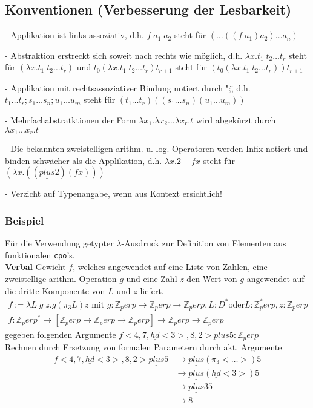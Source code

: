 \subsection{Konventionen (Verbesserung der Lesbarkeit)}
\begin{compactitem}
\item[-] Applikation ist links assoziativ, d.h. $f \; a_1 \; a_2$ steht für $(\dots((f\;a_1)a_2)\dots a_n)$
\item[-] Abstraktion erstreckt sich soweit nach rechts wie möglich, d.h. $\lambda x.t_1 \; t_2 \dots t_r$ steht für $(\lambda x.t_1 \; t_2 \dots t_r)$ und $t_0 (\lambda x.t_1 \; t_2 \dots t_r) t_{r+1}$ steht für $(t_0 (\lambda x. t_1 \; t_2 \dots t_r) ) t_{r+1}$
\item[-] Applikation mit rechtsassoziativer Bindung notiert durch ";\", d.h. $t_1 \dots t_r; s_1 \dots s_n; u_1 \dots u_m$ steht für $(t_1 \dots t_r) ((s_1 \dots s_n)( u_1 \dots u_m))$
\item[-] Mehrfachabstratktionen der Form $\lambda x_1.\lambda x_2 \dots \lambda x_r.t$ wird abgekürzt durch $\lambda x_1 \dots x_r . t$
\item[-] Die bekannten zweistelligen arithm. u. log. Operatoren werden Infix notiert und binden schwächer als die Applikation, d.h. $\lambda x. 2 + f x$ steht für $(\lambda x.((\underline{plus} 2)(f x)))$
\item[-] Verzicht auf Typenangabe, wenn aus Kontext ersichtlich!
\end{compactitem}

\subsubsection*{Beispiel} 
Für die Verwendung getypter $\lambda$-Ausdruck zur Definition von Elementen aus funktionalen \lstinline!cpo!'s.\\
\textbf{Verbal} Gewicht $f$, welches angewendet auf eine Liste von Zahlen, eine zweistellige arithm. Operation $g$ und eine Zahl $z$ den Wert von $g$ angewendet auf die dritte Komponente von $L$ und $z$ liefert.
\begin{align*}
f:=\lambda L\; g \;z . g (\pi_3 L) z \text{ mit } g : \mathbb{Z}_perp \rightarrow \mathbb{Z}_perp \rightarrow \mathbb{Z}_perp, L : D^* \text{oder} L : \mathbb{Z}^*_perp, z : \mathbb{Z}_perp\\
f : \mathbb{Z}_perp^* \rightarrow [\mathbb{Z}_perp \rightarrow \mathbb{Z}_perp \rightarrow \mathbb{Z}_perp] \rightarrow \mathbb{Z}_perp \rightarrow \mathbb{Z}_perp
\end{align*}
gegeben folgenden Argumente $f <4, 7, \underline{hd}<3>, 8, 2> \underline{plus} 5 : \mathbb{Z}_perp $ \\
Rechnen durch Ersetzung von formalen Parametern durch akt. Argumente
\begin{align*}
f <4, 7, \underline{hd}<3>, 8, 2> \underline{plus} 5 &\rightarrow \underline{plus} (\pi_3 <\dots>) 5 \\
&\rightarrow \underline{plus} (\underline{hd}<3>) 5 \\
&\rightarrow \underline{plus} 3 5 \\
& \rightarrow 8\\
\end{align*}
